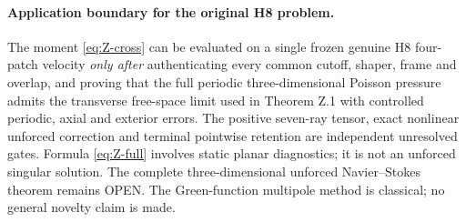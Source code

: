 \paragraph{Application boundary for the original H8 problem.}
The moment \eqref{eq:Z-cross} can be evaluated on a single frozen genuine H8 four-patch velocity \emph{only after} authenticating every common cutoff, shaper, frame and overlap, and proving that the full periodic three-dimensional Poisson pressure admits the transverse free-space limit used in Theorem Z.1 with controlled periodic, axial and exterior errors. The positive seven-ray tensor, exact nonlinear unforced correction and terminal pointwise retention are independent unresolved gates. Formula \eqref{eq:Z-full} involves static planar diagnostics; it is not an unforced singular solution. The complete three-dimensional unforced Navier--Stokes theorem remains OPEN. The Green-function multipole method is classical; no general novelty claim is made.
